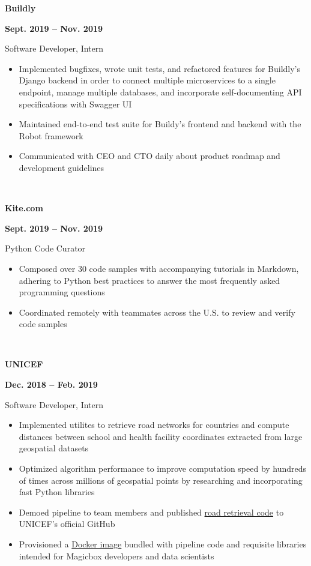 \documentclass[letterpaper, 11pt]{article}
\newcommand{\expentry}[5]{

    \begin{minipage}[b]{0.5\textwidth}
        \raggedright
        \bf\large #3
        \end{minipage}%
        \begin{minipage}[b]{0.5\textwidth}
        \raggedleft
        \bf {#1} -- {#2}
        \end{minipage}

    \begin{minipage}[t]{\linewidth}
    \vspace{-3mm}
    #4
    \vspace{-1.75mm}
    \small{#5}
    \end{minipage}\\
    \vspace{1mm}
    }
\begin{document}
    
    \expentry{Sept. 2019}
    {Nov. 2019}
    {Buildly}
    {Software Developer, Intern}
    {
        \begin{itemize}
          \setlength\itemsep{-0.5mm}
          \item Implemented bugfixes, wrote unit tests, and refactored features for Buildly's Django backend in order to connect multiple microservices to a single endpoint, manage multiple databases, and incorporate self-documenting API specifications with Swagger UI
          \item Maintained end-to-end test suite for Buildy's frontend and backend with the Robot framework
          \item Communicated with CEO and CTO daily about product roadmap and development guidelines
        \end{itemize}
        
    }

    \expentry{Sept. 2019}
    {Nov. 2019}
    {Kite.com}
    {Python Code Curator}
    {
        \begin{itemize}
          \setlength\itemsep{-0.5mm}
          \item Composed over 30 code samples with accompanying tutorials in Markdown, adhering to Python best practices to answer the most frequently asked programming questions
          \item Coordinated remotely with teammates across the U.S. to review and verify code samples
         \end{itemize}
        
    }


    \expentry{Dec. 2018}
    {Feb. 2019}
    {UNICEF}
    {Software Developer, Intern}
    {
        \begin{itemize}{\leftmargin=0.5em \itemindent=0em}
          \setlength\itemsep{-0.5mm}
          \item Implemented utilites to retrieve road networks for countries and compute distances between school and health facility coordinates extracted from large geospatial datasets 
          \item Optimized algorithm performance to improve computation speed by hundreds of times across millions of geospatial points by researching and incorporating fast Python libraries
          \item Demoed pipeline to team members and published \href{https://github.com/unicef/magicbox-download-roads}{road retrieval code} to UNICEF's official GitHub
          \item Provisioned a \href{https://hub.docker.com/r/msradam/magicbox-tools}{Docker image} bundled with pipeline code and requisite libraries intended for Magicbox developers and data scientists
        \end{itemize}
        
    }
\end{document}
